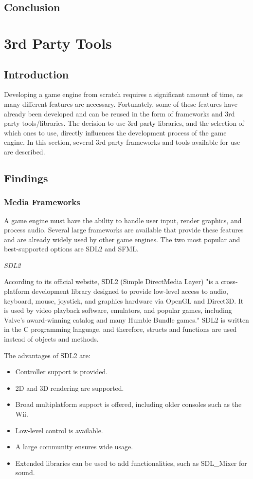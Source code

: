 \documentclass{projdoc}
\begin{document}
    \subsection{Conclusion}
    \section{3rd Party Tools} 
    \subsection{Introduction} 
    Developing a game engine from scratch requires a significant amount of time, as many different features are necessary. 
    Fortunately, some of these features have already been developed and can be reused in the form of frameworks and 3rd party tools/libraries. The decision to use 3rd party libraries, and the selection of which ones to use, directly influences the development process of the game engine. In this section, several 3rd party frameworks and tools available for use are described.

    \subsection{Findings} 
    \subsubsection{Media Frameworks} 
    A game engine must have the ability to handle user input, render graphics, and process audio. Several large frameworks are available that provide these features and are already widely used by other game engines. 
    The two most popular and best-supported options are SDL2 and SFML.
    
    \emph{SDL2}
    
    According to its official website, SDL2 (Simple DirectMedia Layer) "is a cross-platform development library designed to provide low-level access to audio, keyboard, mouse, joystick, and graphics hardware via OpenGL and Direct3D. It is used by video playback software, emulators, and popular games, including Valve's award-winning catalog and many Humble Bundle games." 
    SDL2 is written in the C programming language, and therefore, structs and functions are used instead of objects and methods.
    
    The advantages of SDL2 are: 
    \begin{itemize} 
        \item Controller support is provided. 
        \item 2D and 3D rendering are supported. 
        \item Broad multiplatform support is offered, including older consoles such as the Wii. 
        \item Low-level control is available. 
        \item A large community ensures wide usage. 
        \item Extended libraries can be used to add functionalities, such as SDL\_Mixer for sound. 
    \end{itemize}
    
\end{document}
